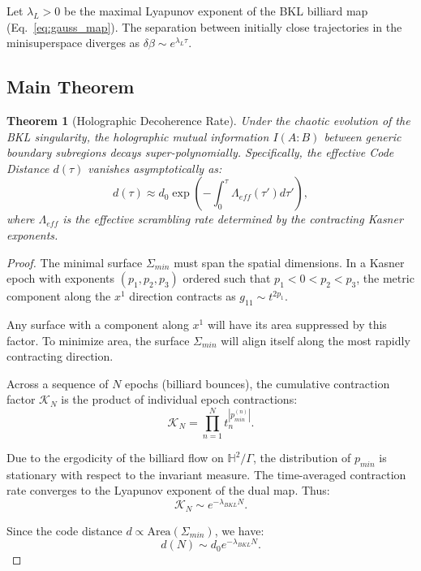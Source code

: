 \documentclass[aps,prd,reprint,nofootinbib,amsmath,amssymb,amsfonts]{revtex4-2}
\newtheorem{theorem}{Theorem}[section]
\begin{document}
Let $\lambda_L > 0$ be the maximal Lyapunov exponent of the BKL billiard map (Eq.~\ref{eq:gauss_map}). The separation between initially close trajectories in the minisuperspace diverges as $\delta \beta \sim e^{\lambda_L \tau}$.

\subsection{Main Theorem}

\begin{theorem}[Holographic Decoherence Rate]
Under the chaotic evolution of the BKL singularity, the holographic mutual information $I(A:B)$ between generic boundary subregions decays super-polynomially. Specifically, the effective Code Distance $d(\tau)$ vanishes asymptotically as:
\begin{equation}
    d(\tau) \approx d_0 \exp\left( - \int_0^\tau \Lambda_{eff}(\tau') d\tau' \right),
    \label{eq:main_theorem}
\end{equation}
where $\Lambda_{eff}$ is the effective scrambling rate determined by the contracting Kasner exponents.
\end{theorem}

\begin{proof}
The minimal surface $\Sigma_{min}$ must span the spatial dimensions. In a Kasner epoch with exponents $(p_1, p_2, p_3)$ ordered such that $p_1 < 0 < p_2 < p_3$, the metric component along the $x^1$ direction contracts as $g_{11} \sim t^{2p_1}$.

Any surface with a component along $x^1$ will have its area suppressed by this factor. To minimize area, the surface $\Sigma_{min}$ will align itself along the most rapidly contracting direction.

Across a sequence of $N$ epochs (billiard bounces), the cumulative contraction factor $\mathcal{K}_N$ is the product of individual epoch contractions:
\begin{equation}
    \mathcal{K}_N = \prod_{n=1}^{N} t_n^{|p_{min}^{(n)}|}.
\end{equation}

Due to the ergodicity of the billiard flow on $\mathbb{H}^2/\Gamma$, the distribution of $p_{min}$ is stationary with respect to the invariant measure. The time-averaged contraction rate converges to the Lyapunov exponent of the dual map. Thus:
\begin{equation}
    \mathcal{K}_N \sim e^{-\lambda_{BKL} N}.
\end{equation}

Since the code distance $d \propto \text{Area}(\Sigma_{min})$, we have:
\begin{equation}
    d(N) \sim d_0 e^{-\lambda_{BKL} N}.
\end{equation}
\end{proof}
\end{document}
